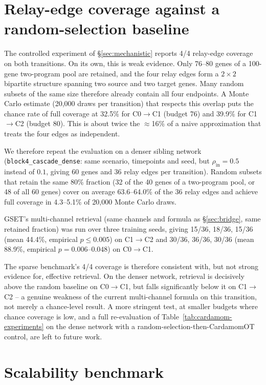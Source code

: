 \documentclass[10pt, letterpaper]{article}
\begin{document}
\section{Relay-edge coverage against a random-selection baseline}
\label{app:random-baseline}

The controlled experiment of \S\ref{sec:mechanistic} reports 4/4 relay-edge coverage on both transitions. On its own, this is weak evidence. Only 76--80 genes of a 100-gene two-program pool are retained, and the four relay edges form a $2\times2$ bipartite structure spanning two source and two target genes. Many random subsets of the same size therefore already contain all four endpoints. A Monte Carlo estimate (20{,}000 draws per transition) that respects this overlap puts the chance rate of full coverage at 32.5\% for C0$\to$C1 (budget 76) and 39.9\% for C1$\to$C2 (budget 80). This is about twice the $\approx$16\% of a naive approximation that treats the four edges as independent.

We therefore repeat the evaluation on a denser sibling network (\texttt{block4\_cascade\_dense}: same scenario, timepoints and seed, but $\rho_{\mathrm{in}}=0.5$ instead of $0.1$, giving 60 genes and 36 relay edges per transition). Random subsets that retain the same 80\% fraction (32 of the 40 genes of a two-program pool, or 48 of all 60 genes) cover on average 63.6--64.0\% of the 36 relay edges and achieve full coverage in 4.3--5.1\% of 20{,}000 Monte Carlo draws.

GSET's multi-channel retrieval (same channels and formula as \S\ref{sec:bridge}, same retained fraction) was run over three training seeds, giving 15/36, 18/36, 15/36 (mean 44.4\%, empirical $p\le0.005$) on C1$\to$C2 and 30/36, 36/36, 30/36 (mean 88.9\%, empirical $p=0.006$--$0.048$) on C0$\to$C1.

The sparse benchmark's 4/4 coverage is therefore consistent with, but not strong evidence for, effective retrieval. On the denser network, retrieval is decisively above the random baseline on C0$\to$C1, but falls significantly below it on C1$\to$C2 -- a genuine weakness of the current multi-channel formula on this transition, not merely a chance-level result. A more stringent test, at smaller budgets where chance coverage is low, and a full re-evaluation of Table~\ref{tab:cardamom-experiments} on the dense network with a random-selection-then-CardamomOT control, are left to future work.

\section{Scalability benchmark}
\label{app:scalability}
\end{document}
